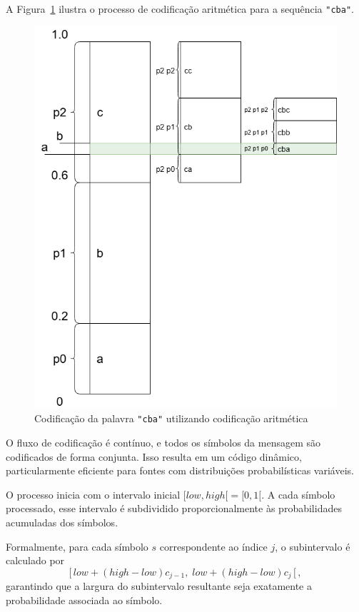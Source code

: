 A Figura~\ref{fig:Diagramas-Aritmetic-Encoding} ilustra o processo de codificação aritmética para a sequência \texttt{"cba"}.

\begin{figure}[ht]
	\centering
	\caption{Codificação da palavra \texttt{"cba"} utilizando codificação aritmética}
	\label{fig:Diagramas-Aritmetic-Encoding}
	\includegraphics[width=13cm]{figuras/DiagramasTCC-Aritmetic-Encoding}
\end{figure}

O fluxo de codificação é contínuo, e todos os símbolos da mensagem são codificados de forma conjunta. Isso resulta em um código dinâmico, particularmente eficiente para fontes com distribuições probabilísticas variáveis.

O processo inicia com o intervalo inicial $[low, high[ = [0, 1[$. A cada símbolo processado, esse intervalo é subdividido proporcionalmente às probabilidades acumuladas dos símbolos.

Formalmente, para cada símbolo $s$ correspondente ao índice $j$, o subintervalo é calculado por
\[
[\,low + (high - low) c_{j-1},\; low + (high - low) c_j\,[\,,
\]
garantindo que a largura do subintervalo resultante seja exatamente a probabilidade associada ao símbolo.

